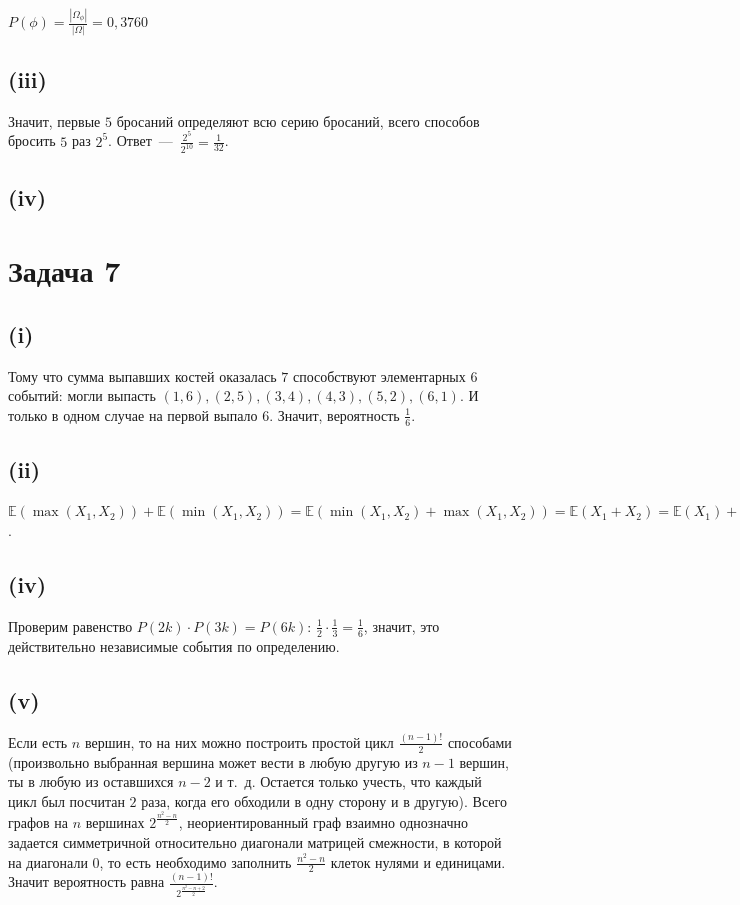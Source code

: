 \documentclass[a4paper,12pt]{article} %
\begin{document}
$P(\phi)=\frac{|\Omega_{\phi}|}{|\Omega|}=0,3760$

\subsection{(iii)}
\hspace{5mm}
Значит, первые $5$ бросаний определяют всю серию бросаний, всего способов бросить $5$ раз $2^5$. Ответ~---~$\frac{2^5}{2^{10}}=\frac{1}{32}$.

\subsection{(iv)}
\hspace{5mm}



\section{Задача 7}
\subsection{(i)}
\hspace{5mm}
Тому что сумма выпавших костей оказалась $7$ способствуют элементарных $6$ событий: могли выпасть $(1,6),(2,5),(3,4),(4,3),(5,2),(6,1)$. И только в одном случае на первой выпало $6$. Значит, вероятность $\frac{1}{6}$.

\subsection{(ii)}
\hspace{5mm}
$\mathbb{E}(\max(X_1,X_2))+\mathbb{E}(\min(X_1,X_2))=\mathbb{E}(\min(X_1,X_2)+\max(X_1,X_2))=\mathbb{E}(X_1+X_2)=\mathbb{E}(X_1)+\mathbb{E}(X_2)=2\mathbb{E}(X)=2\cdot\frac{6+5+4+3+2+1}{6}=2\cdot\frac{21}{6}=\frac{21}{3}=7$.

\subsection{(iv)}
\hspace{5mm}
Проверим равенство $P(2k)\cdot P(3k)=P(6k)$: $\frac{1}{2}\cdot\frac{1}{3}=\frac{1}{6}$, значит, это действительно независимые события по определению.

\subsection{(v)}
\hspace{5mm}
Если есть $n$ вершин, то на них можно построить простой цикл $\frac{(n-1)!}{2}$ способами (произвольно выбранная вершина может вести в любую другую из $n-1$ вершин, ты в любую из оставшихся $n-2$ и т.~д. Остается только учесть, что каждый цикл был посчитан $2$ раза, когда его обходили в одну сторону и в другую). Всего графов на $n$ вершинах $2^{\frac{n^2-n}{2}}$, неориентированный граф взаимно однозначно задается симметричной относительно диагонали матрицей смежности, в которой на диагонали $0$, то есть необходимо заполнить $\frac{n^2-n}{2}$ клеток нулями и единицами. Значит вероятность равна $\frac{(n-1)!}{2^{\frac{n^2-n+2}{2}}}$.
\end{document}
